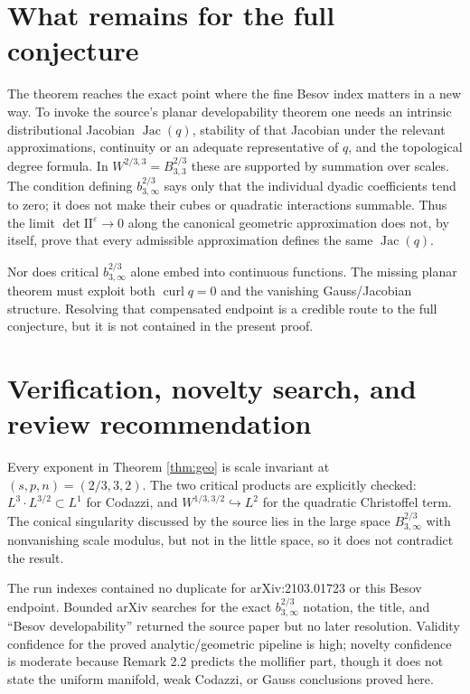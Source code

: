 \documentclass[11pt]{article}
\newcommand{\eps}{\varepsilon}
\newcommand{\curl}{\operatorname{curl}}
\newcommand{\Jac}{\operatorname{Jac}}
\begin{document}
\section*{What remains for the full conjecture}

The theorem reaches the exact point where the fine Besov index matters in a
new way.  To invoke the source's planar developability theorem one needs an
intrinsic distributional Jacobian $\Jac(q)$, stability of that Jacobian under
the relevant approximations, continuity or an adequate representative of
$q$, and the topological degree formula.  In $W^{2/3,3}=B^{2/3}_{3,3}$ these
are supported by summation over scales.  The condition defining
$b^{2/3}_{3,\infty}$ says only that the individual dyadic coefficients tend
to zero; it does not make their cubes or quadratic interactions summable.
Thus the limit $\det\mathrm{II}^\eps\to0$ along the canonical geometric
approximation does not, by itself, prove that every admissible approximation
defines the same $\Jac(q)$.

Nor does critical $b^{2/3}_{3,\infty}$ alone embed into continuous functions.
The missing planar theorem must exploit both $\curl q=0$ and the vanishing
Gauss/Jacobian structure.  Resolving that compensated endpoint is a credible
route to the full conjecture, but it is not contained in the present proof.

\section*{Verification, novelty search, and review recommendation}

Every exponent in Theorem \ref{thm:geo} is scale invariant at
$(s,p,n)=(2/3,3,2)$.  The two critical products are explicitly checked:
$L^3\cdot L^{3/2}\subset L^1$ for Codazzi, and
$W^{1/3,3/2}\hookrightarrow L^2$ for the quadratic Christoffel term.
The conical singularity discussed by the source lies in the large space
$B^{2/3}_{3,\infty}$ with nonvanishing scale modulus, but not in the little
space, so it does not contradict the result.

The run indexes contained no duplicate for arXiv:2103.01723 or this Besov
endpoint.  Bounded arXiv searches for the exact $b^{2/3}_{3,\infty}$ notation,
the title, and ``Besov developability'' returned the source paper but no later
resolution.  Validity confidence for the proved analytic/geometric pipeline
is high; novelty confidence is moderate because Remark 2.2 predicts the
mollifier part, though it does not state the uniform manifold, weak Codazzi,
or Gauss conclusions proved here.
\end{document}
